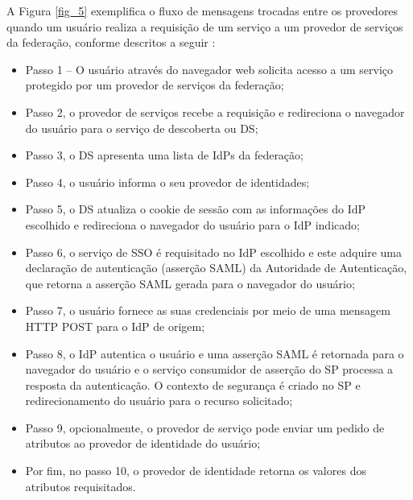 A Figura \ref{fig_5} exemplifica o fluxo de mensagens trocadas entre os provedores quando um usuário realiza a requisição de um serviço a um provedor de serviços da federação, conforme descritos a seguir \cite{feliciano:11}:

\begin{itemize}
 \item Passo 1 -- O usuário através do navegador web solicita acesso a um serviço protegido por um provedor de serviços da federação;
 \item Passo 2, o provedor de serviços recebe a requisição e redireciona o navegador do usuário  para o serviço de descoberta ou DS;
 \item Passo 3, o DS apresenta uma lista de IdPs da federação;
 \item Passo 4, o usuário informa o seu provedor de identidades;
 \item Passo 5, o DS atualiza o cookie de sessão com as informações do IdP escolhido e redireciona o navegador do usuário para o IdP indicado;
 \item Passo 6, o serviço de SSO é requisitado no IdP escolhido e este adquire uma declaração de autenticação (asserção SAML) da Autoridade de Autenticação, que retorna a asserção SAML gerada para o navegador do usuário;
 \item Passo 7, o usuário fornece as suas credenciais por meio de uma mensagem HTTP POST para o IdP de origem;
 \item Passo 8, o IdP autentica o usuário e uma asserção SAML é retornada para o navegador do usuário e o serviço consumidor de asserção do SP processa a resposta da autenticação. O contexto de segurança é criado no SP e redirecionamento do usuário para o recurso solicitado;
 \item Passo 9, opcionalmente, o provedor de serviço pode enviar um pedido de atributos ao provedor de identidade do usuário;
 \item Por fim, no passo 10, o provedor de identidade retorna os valores dos atributos requisitados.
\end{itemize}